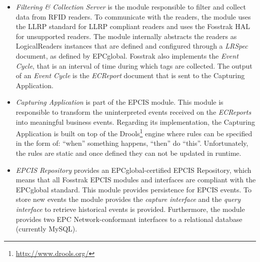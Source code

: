 \begin{itemize}
  \item \textit{Filtering \& Collection Server} is the module responsible to filter and collect data
  from \gls{RFID} readers. To communicate with the readers, the module uses the \gls{LLRP} standard
  for \gls{LLRP} compliant readers and uses the Fosstrak \gls{HAL} for unsupported readers. The
  module internally abstracts the readers as LogicalReaders instances that are defined and configured
  through a \textit{LRSpec} document, as defined by EPCglobal. Fosstrak also implements the
  \textit{Event Cycle}, that is an interval of time during which tags are collected. The output of
  an \textit{Event Cycle} is the \textit{ECReport} document that is sent to the Capturing Application.
  \item \textit{Capturing Application} is part of the EPCIS module. This module is responsible to
  transform the uninterpreted events received on the \textit{ECReports} into meaningful business events.
  Regarding its implementation, the Capturing Application is built on top of the Drools\footnote{\url{http://www.drools.org/}}
  engine where rules can be specified in the form of: ``when'' something happens, ``then'' do ``this''.
  Unfortunately, the rules are static and once defined they can not be updated in runtime.
  \item \textit{EPCIS Repository} provides an EPCglobal-certified EPCIS Repository, which means that
  all Fosstrak EPCIS modules and interfaces are compliant with the EPCglobal standard. This module
  provides persistence for \gls{EPCIS} events. To store new events the module provides the
  \textit{capture interface} and the \textit{query interface} to retrieve historical events is provided.
  Furthermore, the module provides two EPC Network-conformant interfaces to a relational database
  (currently MySQL).
\end{itemize}

